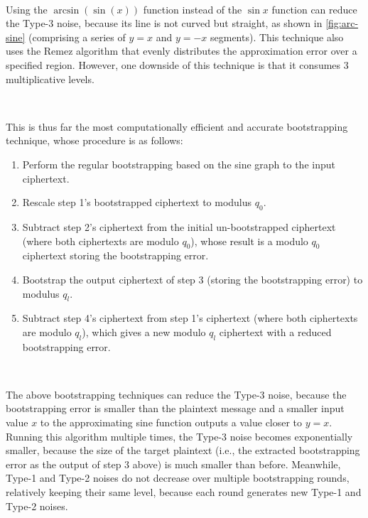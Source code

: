 $ $

 Using the $\arcsin(\sin(x))$ function instead of the $\sin x$ function can reduce the Type-3 noise, because its line is not curved but straight, as shown in \autoref{fig:arc-sine} (comprising a series of $y = x$ and $y = -x$ segments). This technique also uses the Remez algorithm that evenly distributes the approximation error over a specified region. However, one downside of this technique is that it consumes 3 multiplicative levels. 

$ $

 This is thus far the most computationally efficient and accurate bootstrapping technique, whose procedure is as follows:
\begin{enumerate}
\item Perform the regular bootstrapping based on the sine graph to the input ciphertext.
\item Rescale step 1's bootstrapped ciphertext to modulus $q_0$.
\item Subtract step 2's ciphertext from the initial un-bootstrapped ciphertext (where both ciphertexts are modulo $q_0$), whose result is a modulo $q_0$ ciphertext storing the bootstrapping error.
\item Bootstrap the output ciphertext of step 3 (storing the bootstrapping error) to modulus $q_l$.
\item Subtract step 4's ciphertext from step 1's ciphertext (where both ciphertexts are modulo $q_l$), which gives a new modulo $q_l$ ciphertext with a reduced bootstrapping error.
\end{enumerate}

$ $

 The above bootstrapping techniques can reduce the Type-3 noise, because the bootstrapping error is smaller than the plaintext message and a smaller input value $x$ to the approximating sine function outputs a value closer to $y=x$. Running this algorithm multiple times, the Type-3 noise becomes exponentially smaller, because the size of the target plaintext (i.e., the extracted bootstrapping error as the output of step 3 above) is much smaller than before. Meanwhile, Type-1 and Type-2 noises do not decrease over multiple bootstrapping rounds, relatively keeping  their same level, because each round generates new Type-1 and Type-2 noises. 



